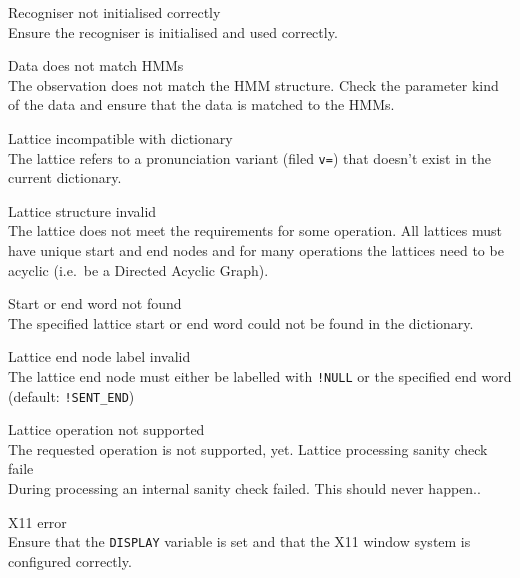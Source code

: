 \begin{itemize}
\begin{itemize}
 Recogniser not initialised correctly\\
        Ensure the recogniser is initialised and used correctly.

    Data does not match HMMs\\
        The observation does not match the HMM structure.  Check the parameter
        kind of the data and ensure that the data is matched to the HMMs.

\end{itemize}



\begin{itemize}

    Lattice incompatible with dictionary\\
        The lattice refers to a pronunciation variant (filed
        \texttt{v=}) that doesn't exist in the current dictionary.

    Lattice structure invalid\\
        The lattice does not meet the requirements for some operation.
        All lattices must have unique start and end nodes and for many
        operations the lattices need to be acyclic (i.e.\ be a
        Directed Acyclic Graph).

    Start or end word not found\\
        The specified lattice start or end word could not be found in
        the dictionary.

    Lattice end node label invalid\\
        The lattice end node must either be labelled with \verb|!NULL|
        or the specified end word (default: \verb|!SENT_END|)


    Lattice operation not supported\\
        The requested operation is not supported, yet.
    Lattice processing sanity check faile\\
        During processing an internal sanity check failed. This should
        never happen..

\end{itemize}



\begin{itemize}
    X11 error\\
        Ensure that the \texttt{DISPLAY} variable is set and that the
        X11 window system is configured correctly.


\end{itemize}
\end{itemize}
